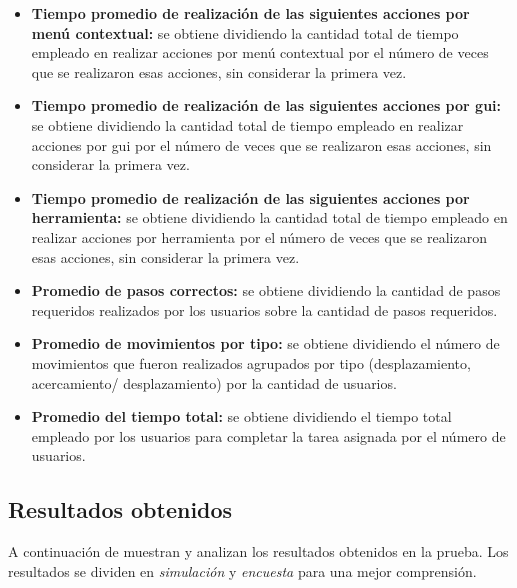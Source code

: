 \begin{itemize}
    
\item \textbf{Tiempo promedio de realización de las siguientes acciones por menú contextual:} 
    se obtiene dividiendo la cantidad total de tiempo empleado en realizar acciones por menú 
    contextual por el número de veces que se realizaron esas acciones, sin considerar la primera 
    vez. 
    
\item \textbf{Tiempo promedio de realización de las siguientes acciones por \Gls{gui}:} 
    se obtiene dividiendo la cantidad total de tiempo empleado en realizar acciones por \Gls{gui} 
    por el número de veces que se realizaron esas acciones, sin considerar la primera 
    vez. 
    
\item \textbf{Tiempo promedio de realización de las siguientes acciones por herramienta:} 
    se obtiene dividiendo la cantidad total de tiempo empleado en realizar acciones por 
    herramienta por el número de veces que se realizaron esas acciones, sin considerar la 
    primera vez. 
    
\item \textbf{Promedio de pasos correctos:} se obtiene dividiendo la cantidad de 
    pasos requeridos realizados por los usuarios sobre la cantidad de pasos requeridos. 
    
\item \textbf{Promedio de movimientos por tipo:} se obtiene dividiendo el número de 
    movimientos que fueron realizados agrupados por tipo (desplazamiento, acercamiento/
    desplazamiento) por la cantidad de usuarios.
    
\item \textbf{Promedio del tiempo total:} se obtiene dividiendo el tiempo total empleado 
    por los usuarios para completar la tarea asignada por el número de usuarios.

\end{itemize}

\subsection{Resultados obtenidos}
\label{sec:res_interfaz}

A continuación de muestran y analizan los resultados obtenidos en la prueba. Los resultados 
se dividen en \emph{simulación} y \emph{encuesta} para una mejor comprensión.

